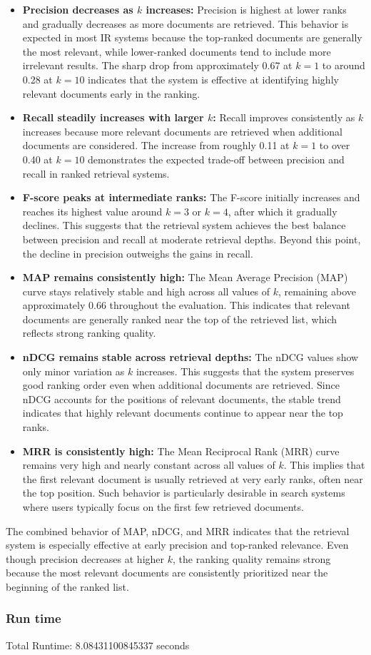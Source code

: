 \begin{itemize}
\item \textbf{Precision decreases as $k$ increases:} Precision is highest at lower ranks and gradually decreases as more documents are retrieved. This behavior is expected in most IR systems because the top-ranked documents are generally the most relevant, while lower-ranked documents tend to include more irrelevant results. The sharp drop from approximately 0.67 at $k=1$ to around 0.28 at $k=10$ indicates that the system is effective at identifying highly relevant documents early in the ranking.
\item \textbf{Recall steadily increases with larger $k$:} Recall improves consistently as $k$ increases because more relevant documents are retrieved when additional documents are considered. The increase from roughly 0.11 at $k=1$ to over 0.40 at $k=10$ demonstrates the expected trade-off between precision and recall in ranked retrieval systems.
\item \textbf{F-score peaks at intermediate ranks:} The F-score initially increases and reaches its highest value around $k=3$ or $k=4$, after which it gradually declines. This suggests that the retrieval system achieves the best balance between precision and recall at moderate retrieval depths. Beyond this point, the decline in precision outweighs the gains in recall.
\item \textbf{MAP remains consistently high:} The Mean Average Precision (MAP) curve stays relatively stable and high across all values of $k$, remaining above approximately 0.66 throughout the evaluation. This indicates that relevant documents are generally ranked near the top of the retrieved list, which reflects strong ranking quality.
\item \textbf{nDCG remains stable across retrieval depths:} The nDCG values show only minor variation as $k$ increases. This suggests that the system preserves good ranking order even when additional documents are retrieved. Since nDCG accounts for the positions of relevant documents, the stable trend indicates that highly relevant documents continue to appear near the top ranks.
\item \textbf{MRR is consistently high:} The Mean Reciprocal Rank (MRR) curve remains very high and nearly constant across all values of $k$. This implies that the first relevant document is usually retrieved at very early ranks, often near the top position. Such behavior is particularly desirable in search systems where users typically focus on the first few retrieved documents.
\end{itemize}

The combined behavior of MAP, nDCG, and MRR indicates that the retrieval system is especially effective at early precision and top-ranked relevance. Even though precision decreases at higher $k$, the ranking quality remains strong because the most relevant documents are consistently prioritized near the beginning of the ranked list.

\subsubsection{Run time}
Total Runtime: 8.08431100845337 seconds
